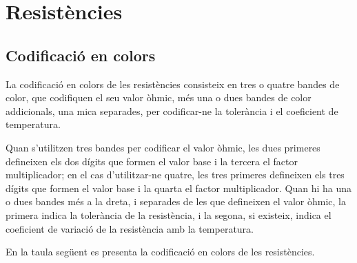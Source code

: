 \chapter{Resistències}\label{chap:resistencies}

\section{Codificació en colors} 

La codificació en colors  de les resistències
consisteix en tres o quatre bandes de color, que codifiquen el seu valor òhmic, més una o dues bandes de color addicionals, una mica separades, per codificar-ne la tolerància i el coeficient de temperatura.

Quan s'utilitzen tres bandes per codificar  el valor òhmic, les dues primeres defineixen els dos dígits que formen el valor
base i la tercera el factor  multiplicador; en el cas d'utilitzar-ne quatre, les tres primeres defineixen els tres dígits que formen el valor base i la quarta  el factor multiplicador. Quan hi ha una o dues bandes més a la dreta, i separades de les que defineixen el valor òhmic, la primera indica la tolerància de la resistència, i la segona, si existeix, indica el coeficient de variació de la resistència  amb la temperatura.

En la taula següent es presenta la codificació en colors de les resistències.


